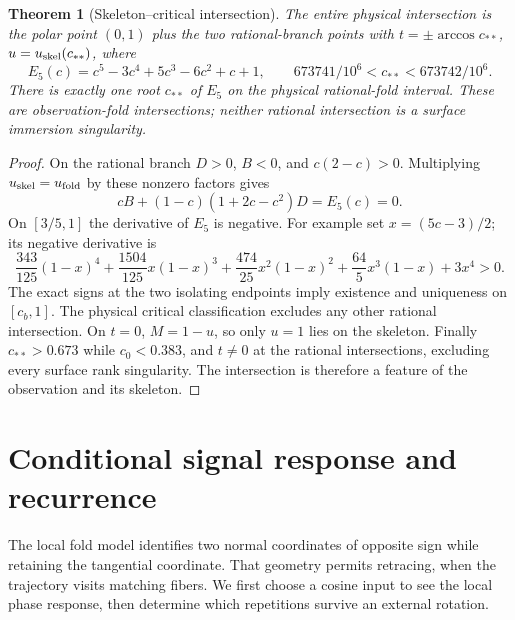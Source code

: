 \documentclass[11pt,a4paper]{article}
\newtheorem{theorem}{Theorem}[section]
\theoremstyle{definition}\newtheorem{definition}[theorem]{Definition}
\theoremstyle{remark}\newtheorem{remark}[theorem]{Remark}
\begin{document}
\begin{theorem}[Skeleton--critical intersection]\label{thm:intersection}
The entire physical intersection is the polar point $(0,1)$ plus the two
rational-branch points with $t=\pm\arccos c_{**}$,
$u=u_{\rm skel}(c_{**})$, where
\[
 E_5(c)=c^5-3c^4+5c^3-6c^2+c+1,\qquad
 673741/10^6<c_{**}<673742/10^6.
\]
There is exactly one root $c_{**}$ of $E_5$ on the physical rational-fold
interval. These are observation-fold intersections; neither rational
intersection is a surface immersion singularity.
\end{theorem}
\begin{proof}
On the rational branch $D>0$, $B<0$, and $c(2-c)>0$.
Multiplying $u_{\rm skel}=u_{\rm fold}$ by these nonzero factors gives
\[
 cB+(1-c)(1+2c-c^2)D=E_5(c)=0.
\]
On $[3/5,1]$ the derivative of $E_5$ is negative. For example set
$x=(5c-3)/2$; its negative derivative is
\[
 \frac{343}{125}(1-x)^4+\frac{1504}{125}x(1-x)^3+
 \frac{474}{25}x^2(1-x)^2+\frac{64}{5}x^3(1-x)+3x^4>0.
\]
The exact signs at the two isolating endpoints imply existence and
uniqueness on $[c_b,1]$. The physical critical classification excludes
any other rational intersection. On $t=0$, $M=1-u$, so only $u=1$
lies on the skeleton. Finally $c_{**}>0.673$ while $c_0<0.383$, and
$t\ne0$ at the rational intersections, excluding every surface rank
singularity. The intersection is therefore a feature of the observation
and its skeleton.
\end{proof}

\section{Conditional signal response and recurrence}\label{sec:signal}
The local fold model identifies two normal coordinates of opposite sign
while retaining the tangential coordinate. That geometry permits retracing,
when the trajectory visits matching fibers. We first choose a cosine
input to see the local phase response, then determine which repetitions
survive an external rotation.
\end{document}
